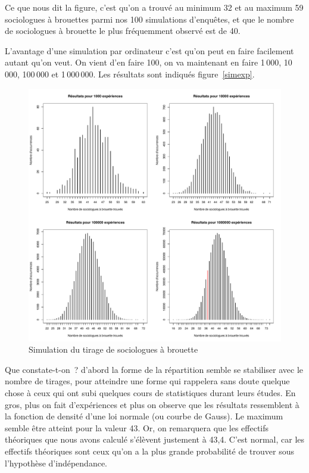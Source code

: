 \documentclass[a4paper,10pt,twoside,francais]{report}
\begin{document}
Ce que nous dit la figure, c'est qu'on a trouvé au minimum 32
et au maximum 59 sociologues à brouettes parmi nos 100 simulations
d'enquêtes, et que le nombre de sociologues à brouette le plus
fréquemment observé est de 40.

L'avantage d'une simulation par ordinateur c'est qu'on peut en faire
facilement autant qu'on veut. On vient d'en faire 100, on va
maintenant en faire 1\,000, 10\,000, 100\,000 et 1\,000\,000. Les
résultats sont indiqués figure~\vref{simexp}.

\begin{figure}
  \begin{center}
    \includegraphics[width=15cm]{images/exp1000_10000_100000.pdf}
  \end{center}
  \caption{Simulation du tirage de sociologues à brouette}
  \label{simexp}
\end{figure}

Que constate-t-on~? d'abord la forme de la répartition semble se
stabiliser avec le nombre de tirages, pour atteindre une forme qui
rappelera sans doute quelque chose à ceux qui ont subi quelques cours
de statistiques durant leurs études. En gros, plus on fait
d'expériences et plus on observe que les résultats ressemblent à la
fonction de densité d'une loi normale (ou courbe de Gauss). Le maximum
semble être atteint pour la valeur 43. Or, on remarquera que les
effectifs théoriques que nous avons calculé s'élèvent justement à
43,4. C'est normal, car les effectifs théoriques sont ceux qu'on a la
plus grande probabilité de trouver sous l'hypothèse d'indépendance.
\end{document}
